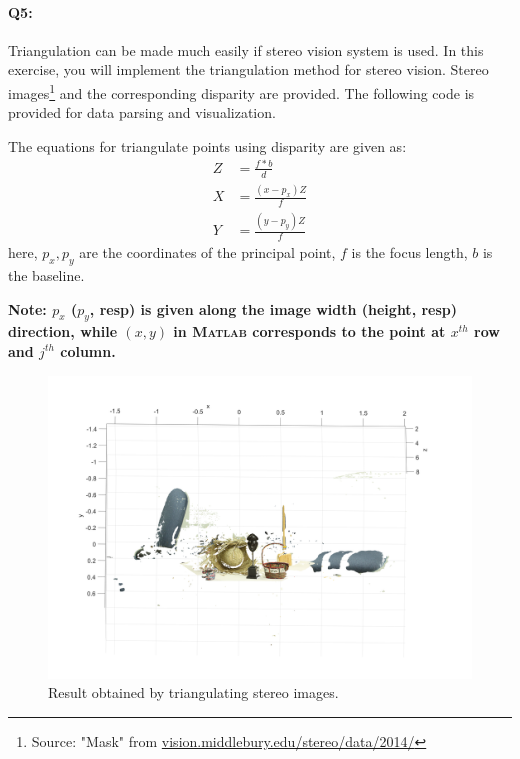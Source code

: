\documentclass[a4paper]{article}
\begin{document}
\paragraph{Q5:}
Triangulation can be made much easily if stereo vision system is used. In this exercise, you will implement the triangulation method for stereo vision. Stereo images\footnote{Source: "Mask" from \url{vision.middlebury.edu/stereo/data/2014/}} and the corresponding disparity are provided. The following code is provided for data parsing and visualization.


The equations for triangulate points using disparity are given as:
\begin{align*}
Z &= \frac{f*b}{d} \\
X &= \frac{(x-p_x)Z}{f} \\ 
Y &= \frac{(y-p_y)Z}{f}
\end{align*}
here, $p_x,p_y$ are the coordinates of the principal point, $f$ is the focus length, $b$ is the baseline.

\textbf{Note: $p_x$ ($p_y$, resp) is given along the image width (height, resp) direction, while $(x,y)$ in \textsc{Matlab} corresponds to the point at $x^{th}$ row and $j^{th}$ column.} 

\begin{figure}[!b]
\centering
\includegraphics[scale=0.5]{figures/stereo.png}
\caption{Result obtained by triangulating stereo images.}
\end{figure}
 
 

\end{document}
